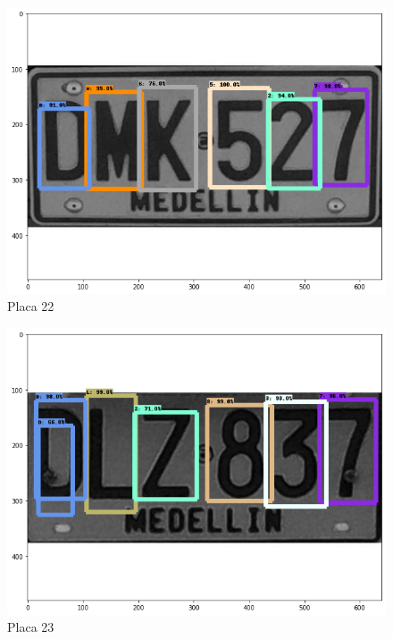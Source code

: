 
\begin{figure}[H]
\centering
\includegraphics[width=0.4\linewidth]{imagenes/caracteres detectados/nuevo entrenamiento/31.png}
\caption{Placa 22}
\label{fig:caracteres detectados p27}
\end{figure}

\begin{table}[H]
    \centering
    \caption{Detección de caracteres con porcentajes de acierto placa 22}
    \label{tab:p27}
\end{table}




\begin{figure}[H]
\centering
\includegraphics[width=0.4\linewidth]{imagenes/caracteres detectados/nuevo entrenamiento/7.png}
\caption{Placa 23}
\label{fig:caracteres detectados p29}
\end{figure}

